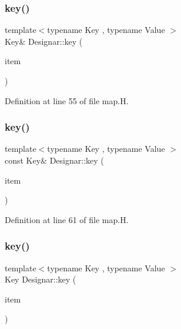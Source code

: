 \subsubsection{\texorpdfstring{key()}{key()}\hspace{0.1cm}{\footnotesize\ttfamily [1/4]}}
{\footnotesize\ttfamily template$<$typename Key , typename Value $>$ \\
Key\& Designar\+::key (\begin{DoxyParamCaption}\item[{\hyperlink{namespace_designar_a7394b1b25278abf7211e77b91eb5204f}{Map\+Key}$<$ Key, Value $>$ \&}]{item }\end{DoxyParamCaption})}



Definition at line 55 of file map.\+H.

\mbox{\label{namespace_designar_aa8f8b118fb59d977b693196954abca76}} 
\subsubsection{\texorpdfstring{key()}{key()}\hspace{0.1cm}{\footnotesize\ttfamily [2/4]}}
{\footnotesize\ttfamily template$<$typename Key , typename Value $>$ \\
const Key\& Designar\+::key (\begin{DoxyParamCaption}\item[{const \hyperlink{namespace_designar_a7394b1b25278abf7211e77b91eb5204f}{Map\+Key}$<$ Key, Value $>$ \&}]{item }\end{DoxyParamCaption})}



Definition at line 61 of file map.\+H.

\mbox{\label{namespace_designar_a02dd98d2c308a1eb7f11ec2e5cb1b382}} 
\subsubsection{\texorpdfstring{key()}{key()}\hspace{0.1cm}{\footnotesize\ttfamily [3/4]}}
{\footnotesize\ttfamily template$<$typename Key , typename Value $>$ \\
Key Designar\+::key (\begin{DoxyParamCaption}\item[{\hyperlink{namespace_designar_a7394b1b25278abf7211e77b91eb5204f}{Map\+Key}$<$ Key, Value $>$ \&\&}]{item }\end{DoxyParamCaption})}



